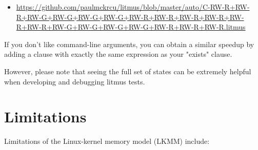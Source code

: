 \begin{itemize}
\item \url{https://github.com/paulmckrcu/litmus/blob/master/auto/C-RW-R+RW-R+RW-G+RW-G+RW-G+RW-G+RW-R+RW-R+RW-R+RW-R+RW-R+RW-R+RW-G+RW-G+RW-G+RW-G+RW-R+RW-R+RW-R.litmus}
\end{itemize}

If you don't like command-line arguments, you can obtain a similar speedup
by adding a  clause with exactly the same expression as your
"exists" clause.

However, please note that seeing the full set of states can be extremely
helpful when developing and debugging litmus tests.


\section{Limitations}

Limitations of the Linux-kernel memory model (LKMM) include:


